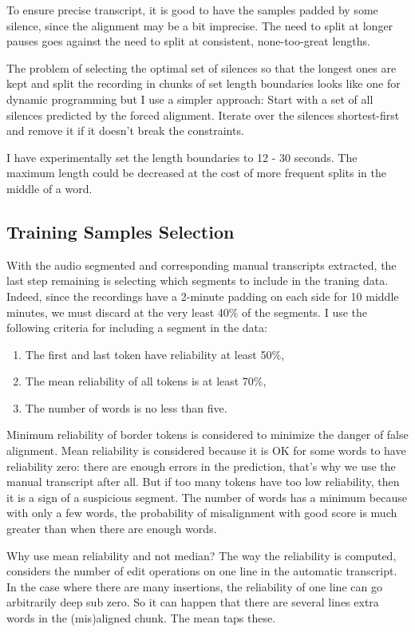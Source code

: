 \documentclass[runningheads,a4paper]{llncs}
\begin{document}
To ensure precise transcript, it is good to have the samples padded by some
silence, since the alignment may be a bit imprecise. The need to split at longer
pauses goes against the need to split at consistent, none-too-great lengths.

The problem of selecting the optimal set of silences so that the longest ones
are kept and split the recording in chunks of set length boundaries looks like
one for dynamic programming but I use a simpler approach: Start with a set of
all silences predicted by the forced alignment. Iterate over the silences
shortest-first and remove it if it doesn't break the constraints.

I have experimentally set the length boundaries to 12 - 30 seconds. The maximum
length could be decreased at the cost of more frequent splits in the middle of a
word.

\subsection{Training Samples Selection}

With the audio segmented and corresponding manual transcripts extracted, the
last step remaining is selecting which segments to include in the traning data.
Indeed, since the recordings have a 2-minute padding on each side for 10 middle
minutes, we must discard at the very least 40\% of the segments. I use the
following criteria for including a segment in the data:

\begin{enumerate}
\item{The first and last token have reliability at least 50\%,}
\item{The mean reliability of all tokens is at least 70\%,}
\item{The number of words is no less than five.}
\end{enumerate}

Minimum reliability of border tokens is considered to minimize the danger of
false alignment. Mean reliability is considered because it is OK for some
words to have reliability zero: there are enough errors in the prediction,
that's why we use the manual transcript after all. But if too many tokens have
too low reliability, then it is a sign of a suspicious segment. The number of
words has a minimum because with only a few words, the probability of
misalignment with good score is much greater than when there are enough words.

Why use mean reliability and not median? The way the reliability is computed,
considers the number of edit operations on one line in the automatic transcript.
In the case where there are many insertions, the reliability of one line can go
arbitrarily deep sub zero. So it can happen that there are several lines
extra words in the (mis)aligned chunk. The mean taps these.
\end{document}
